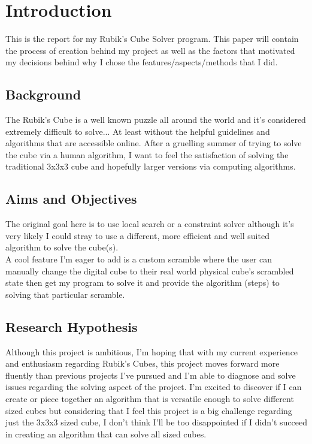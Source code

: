 \section{Introduction}
This is the report for my Rubik's Cube Solver program. This paper will contain the process of creation behind my project as well as the factors that motivated my decisions behind why I chose the features/aspects/methods that I did.
\subsection{Background}
The Rubik's Cube is a well known puzzle all around the world and it's considered extremely difficult to solve... At least without the helpful guidelines and algorithms that are accessible online. After a gruelling summer of trying to solve the cube via a human algorithm, I want to feel the satisfaction of solving the traditional 3x3x3 cube and hopefully larger versions via computing algorithms. 
\subsection{Aims and Objectives}
The original goal here is to use local search or a constraint solver although it's very likely I could stray to use a different, more efficient and well suited algorithm to solve the cube(s).
\\
A cool feature I'm eager to add is a custom scramble where the user can manually change the digital cube to their real world physical cube's scrambled state then get my program to solve it and provide the algorithm (steps) to solving that particular scramble.
\\


\subsection{Research Hypothesis}
Although this project is ambitious, I'm hoping that with my current experience and enthusiasm regarding Rubik's Cubes, this project moves forward more fluently than previous projects I've pursued and I'm able to diagnose and solve issues regarding the solving aspect of the project.
\newline
I'm excited to discover if I can create or piece together an algorithm that is versatile enough to solve different sized cubes but considering that I feel this project is a big challenge regarding just the 3x3x3 sized cube, I don't think I'll be too disappointed if I didn't succeed in creating an algorithm that can solve all sized cubes.

\newpage